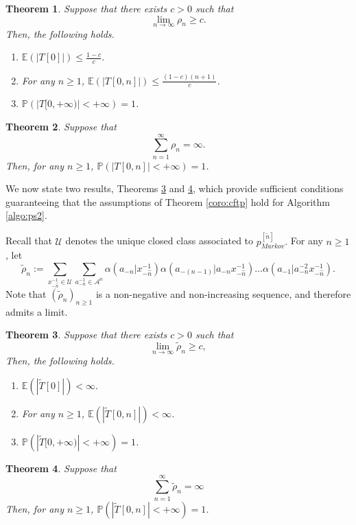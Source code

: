 \documentclass[a4paper]{article}
\newtheorem{theorem}{Theorem}%
\def\P{{\mathbb P}}
\newcommand{\E}{\mathbb{E}}
\newcommand{\A}{\mathcal{A}}
\begin{document}
\begin{theorem} \label{teo:infinitepath}
Suppose that there exists $c>0$ such that
$$
\lim_{n\to \infty}\rho_n\geq c.
$$
Then, the following holds.
\begin{enumerate}
\item $\E(|T[0]|)\leq \frac{1-c}{c}.$

\item For any $n\geq 1$, $\E(|T[0,n]|)\leq \frac{(1-c)(n+1)}{c}$.

\item $\P(|T[0,+\infty)|<+\infty) =1$.
\end{enumerate}
\end{theorem}

\begin{theorem} \label{teo:renewal}
Suppose that
$$
\sum_{n=1}^{\infty}\rho_n=\infty.
$$
Then, for any $n\geq 1$, $\P(|T[0,n]|<+\infty)=1$.
\end{theorem}

We now state two results, Theorems \ref{teo:algops2_1} and \ref{teo:algops2_2}, which provide sufficient conditions guaranteeing that the assumptions of Theorem \ref{coro:cftp} hold for Algorithm \ref{algo:ps2}.

Recall that  $\mathcal{U}$ denotes the unique closed class associated to $p^{[\tilde{n}]}_{Markov}.$ For any $n\geq 1$, let
$$
\tilde{\rho}_n:=\sum_{x_{-\hat{n}}^{-1}\in \mathcal{U}}\sum_{a_{-n}^{-1}\in \A^n}\alpha(a_{-n}|x_{-\hat{n}}^{-1})\alpha(a_{-(n-1)}|a_{-n}x_{-\hat{n}}^{-1})\ldots \alpha(a_{-1}|a_{-n}^{-2}x_{-\hat{n}}^{-1}).
$$
Note that $(\tilde{\rho}_n)_{n\geq 1}$ is a non-negative and non-increasing sequence, and therefore admits a limit.

\begin{theorem}\label{teo:algops2_1}
Suppose that there exists $c>0$ such that
$$
\lim_{n\to \infty}\tilde{\rho}_n\geq c,
$$
Then, the following holds.
\begin{enumerate} 
\item $\E(|\tilde{T}[0]|)<\infty.$

\item For any $n\geq 1$, $\E(|\tilde{T}[0,n]|)<\infty$.

\item $\P(|\tilde{T}[0,+\infty)|<+\infty) =1$.
\end{enumerate}
\end{theorem} 

\begin{theorem}\label{teo:algops2_2}
Suppose that
$$
\sum_{n=1}^{\infty}\tilde{\rho}_n=\infty
$$
Then, for any $n\geq 1$, $\P(|\tilde{T}[0,n]|<+\infty)=1$.
\end{theorem}
\end{document}
